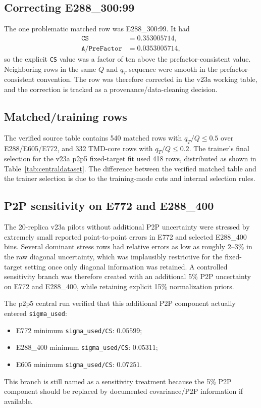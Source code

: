 \documentclass[11pt]{article}
\newcommand{\qT}{q_T}
\newcommand{\code}[1]{\texttt{#1}}
\begin{document}
\subsection{Correcting E288\_300:99}

The one problematic matched row was E288\_300:99.  It had
\begin{align}
  \code{CS} &= 0.353005714,\\
  \code{A/PreFactor} &= 0.0353005714,
\end{align}
so the explicit \code{CS} value was a factor of ten above the prefactor-consistent value.  Neighboring rows in the same $Q$ and $\qT$ sequence were smooth in the prefactor-consistent convention.  The row was therefore corrected in the v23a working table, and the correction is tracked as a provenance/data-cleaning decision.

\subsection{Matched/training rows}

The verified source table contains 540 matched rows with $\qT/Q\le0.5$ over E288/E605/E772, and 332 TMD-core rows with $\qT/Q\le0.2$.  The trainer's final selection for the v23a p2p5 fixed-target fit used 418 rows, distributed as shown in Table~\ref{tab:centraldataset}.  The difference between the verified matched table and the trainer selection is due to the training-mode cuts and internal selection rules.

\subsection{P2P sensitivity on E772 and E288\_400}

The 20-replica v23a pilots without additional P2P uncertainty were stressed by extremely small reported point-to-point errors in E772 and selected E288\_400 bins.  Several dominant stress rows had relative errors as low as roughly $2$--$3\%$ in the raw diagonal uncertainty, which was implausibly restrictive for the fixed-target setting once only diagonal information was retained.  A controlled sensitivity branch was therefore created with an additional 5\% P2P uncertainty on E772 and E288\_400, while retaining explicit 15\% normalization priors.

The p2p5 central run verified that this additional P2P component actually entered \code{sigma\_used}:
\begin{itemize}
  \item E772 minimum \code{sigma\_used/CS}: $0.05599$;
  \item E288\_400 minimum \code{sigma\_used/CS}: $0.05311$;
  \item E605 minimum \code{sigma\_used/CS}: $0.07251$.
\end{itemize}
This branch is still named as a sensitivity treatment because the 5\% P2P component should be replaced by documented covariance/P2P information if available.
\end{document}

